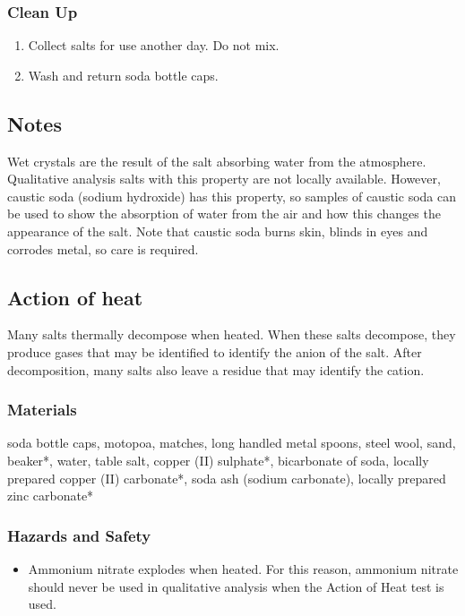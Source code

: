 \subsubsection{Clean Up}
\begin{enumerate}
\item{Collect salts for use another day. Do not mix.}
\item{Wash and return soda bottle caps.}
\end{enumerate}

\subsection{Notes}

Wet crystals are the result of the salt absorbing water from the atmosphere. Qualitative analysis salts with this property are not locally available. However, caustic soda (sodium hydroxide) has this property, so samples of caustic soda can be used to show the absorption of water from the air and how this changes the appearance of the salt. Note that caustic soda burns skin, blinds in eyes and corrodes metal, so care is required.
\subsection{Action of heat}

Many salts thermally decompose when heated. When these salts decompose, they produce gases that may be identified to identify the anion of the salt. After decomposition, many salts also leave a residue that may identify the cation.

\subsubsection{Materials}
soda bottle caps, motopoa, matches, long handled metal spoons, steel wool, sand, beaker*, water, table salt, copper (II) sulphate*, bicarbonate of soda, locally prepared copper (II) carbonate*, soda ash (sodium carbonate), locally prepared zinc carbonate*


\subsubsection{Hazards and Safety}
\begin{itemize}
\item{Ammonium nitrate explodes when heated. For this reason, ammonium nitrate should never be used in qualitative analysis when the Action of Heat test is used.}
\end{itemize}

